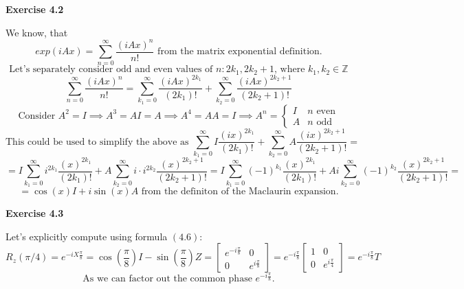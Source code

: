 \documentclass{article}
\begin{document}
\begin{framed}
    \noindent \textbf{Exercise 4.2}
    
    \medskip

    We know, that 
        $$
            exp(iAx) = \sum_{n=0}^{\infty}{\frac{(iAx)^n}{n!}} \text{ from the matrix exponential definition.}
        $$
        $$
            \text{Let's separately consider odd and even values of } n: 2k_1, 2k_2+1 \text{, where } k_1,k_2 \in \mathbb{Z}
        $$
        $$
            \sum_{n=0}^{\infty}{\frac{(iAx)^n}{n!}}=\sum_{k_1=0}^{\infty}{\frac{(iAx)^{2k_1}}{(2k_1)!}} + \sum_{k_2=0}^{\infty}{\frac{(iAx)^{2k_2+1}}{(2k_2+1)!}}
        $$
        $$
            \text{Consider } A^2 = I \implies A^3 = AI = A \implies A^4 = AA = I \implies A^n = 
            \begin{cases}
                I & n \text{ even} \\
                A & n \text{ odd}
            \end{cases}
        $$
        $$
            \text{This could be used to simplify the above as } \sum_{k_1=0}^{\infty}{I\frac{(ix)^{2k_1}}{(2k_1)!}} + \sum_{k_2=0}^{\infty}{A\frac{(ix)^{2k_2+1}}{(2k_2+1)!}} = 
        $$
        $$
            = I\sum_{k_1=0}^{\infty}{i^{2k_1}\frac{(x)^{2k_1}}{(2k_1)!}} + A\sum_{k_2=0}^{\infty}{i \cdot i^{2k_2}\frac{(x)^{2k_2+1}}{(2k_2+1)!}} = 
            I\sum_{k_1=0}^{\infty}{(-1)^{k_1}\frac{(x)^{2k_1}}{(2k_1)!}} + Ai\sum_{k_2=0}^{\infty}{(-1)^{k_2}\frac{(x)^{2k_2+1}}{(2k_2+1)!}} = 
        $$
        $$
            = \cos(x)I + i\sin(x)A \text{ from the definiton of the Maclaurin expansion.}
        $$

    
\end{framed}


\bigskip

\begin{framed}
    \noindent \textbf{Exercise 4.3}
    
    \medskip
    Let's explicitly compute using formula $(4.6)$:
    $$
        R_z(\pi / 4) = e^{-iX\frac{\pi}{8}} = \cos(\frac{\pi}{8})I - \sin(\frac{\pi}{8})Z = 
        \begin{bmatrix}
            e^{-i\frac{\pi}{8}} & 0                   \\
            0                   &  e^{i\frac{\pi}{8}}
        \end{bmatrix}
        = e^{-i\frac{\pi}{8}}
        \begin{bmatrix}
            1 & 0                   \\
            0                   &  e^{i\frac{\pi}{4}}
        \end{bmatrix}
        = e^{-i\frac{\pi}{8}}T
    $$
    $$
        \text{As we can factor out the common phase } e^{-i\frac{\pi}{8}}.
    $$

    
    
\end{framed}
\end{document}
